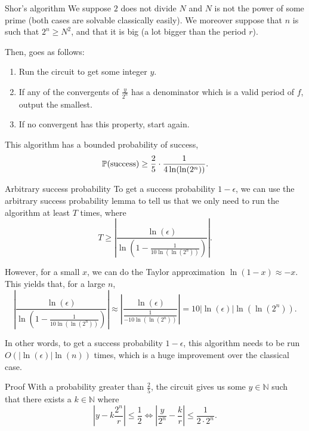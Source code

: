 \documentclass[a4paper]{article}
\begin{document}
\begin{parag}{Shor's algorithm}
    We suppose $2$ does not divide $N$ and $N$ is not the power of some prime (both cases are solvable classically easily). We moreover suppose that $n$ is such that $2^n \geq N^2$, and that it is big (a lot bigger than the period $r$).

    Then,  goes as follows: 
    \begin{enumerate}
        \item Run the circuit to get some integer $y$.
        \item If any of the convergents of $\frac{y}{2^n}$ has a denominator which is a valid period of $f$, output the smallest. 
        \item If no convergent has this property, start again.
    \end{enumerate}

    This algorithm has a bounded probability of success,
    \[\prob\left(\text{success}\right) \geq \frac{2}{5} \cdot  \frac{1}{4 \ln\left(\ln\left(2^n\right)\right)}.\]
    
    \begin{subparag}{Arbitrary success probability}
        To get a success probability $1 - \epsilon$, we can use the arbitrary success probability lemma to tell us that we only need to run the algorithm at least $T$ times, where 
        \[T \geq \left|\frac{\ln\left(\epsilon\right)}{\ln\left(1 - \frac{1}{10 \ln\left(\ln\left(2^n\right)\right)}\right)}\right|.\]

        However, for a small $x$, we can do the Taylor approximation $\ln\left(1 - x\right) \approx -x$. This yields that, for a large $n$,
        \[\left|\frac{\ln\left(\epsilon\right)}{\ln\left(1 - \frac{1}{10 \ln\left(\ln\left(2^n\right)\right)}\right)}\right| \approx \left|\frac{\ln\left(\epsilon\right)}{\frac{1}{-10 \ln\left(\ln\left(2^n\right)\right)}}\right| = 10 \left|\ln\left(\epsilon\right)\right| \ln\left(\ln\left(2^n\right)\right).\]
        
        In other words, to get a success probability $1 - \epsilon$, this algorithm needs to be run $O\left(\left|\ln\left(\epsilon\right)\right| \ln\left(n\right)\right)$ times, which is a huge improvement over the classical case.
    \end{subparag}

    \begin{subparag}{Proof}
        With a probability greater than $\frac{2}{5}$, the circuit gives us some $y \in \mathbb{N}$ such that there exists a $k \in \mathbb{N}$ where
        \[\left|y - k\frac{2^n}{r}\right| \leq \frac{1}{2} \iff \left|\frac{y}{2^n} - \frac{k}{r}\right| \leq \frac{1}{2\cdot 2^n}.\]


\end{subparag}
\end{parag}
\end{document}
